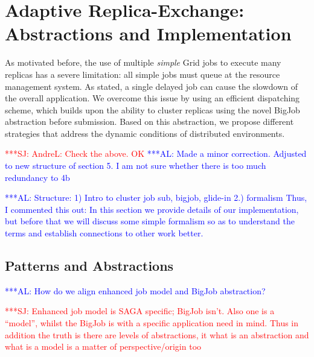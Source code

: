 \documentclass{rspublic}
\newcommand{\alnote}[1]{ {\textcolor{blue} { ***AL: #1 }}}
\newcommand{\jhanote}[1]{ {\textcolor{red} { ***SJ: #1 }}}
\newcommand{\alnote}[1]{}
\newcommand{\jhanote}[1]{}
\begin{document}
\section{Adaptive Replica-Exchange: Abstractions and Implementation}
\label{sec:glidein}

As motivated before, the use of multiple {\it simple} Grid jobs to
execute many replicas has a severe limitation: all simple jobs must
queue at the resource management system. As stated, a single 
delayed job can cause the slowdown of the overall application. 
We overcome this issue by using an efficient dispatching scheme, 
which builds upon the ability to cluster replicas using the novel 
BigJob abstraction before submission. Based on this abstraction, we
propose different strategies that address the dynamic conditions
of distributed environments. 

\jhanote{AndreL: Check the above. OK}
\alnote{Made a minor correction. Adjusted to new structure of section 5. I
am not sure whether there is too much redundancy to 4b}


  \alnote{Structure: 1) Intro to cluster job sub, bigjob, glide-in 2.)
    formalism Thus, I commented this out: In this section we provide
    details of our implementation, but before that we will discuss
    some simple formalism so as to understand the terms and establish
    connections to other work better.  }

               
\subsection{Patterns and Abstractions}
\alnote{How do we align enhanced job model and BigJob abstraction?}

\jhanote{Enhanced job model is SAGA specific; BigJob isn't. Also one
  is a ``model'', whilst the BigJob is with a specific application
  need in mind. Thus in addition the truth is there are levels of
  abstractions, it what is an abstraction and what is a model is a
  matter of perspective/origin too}              
\end{document}

